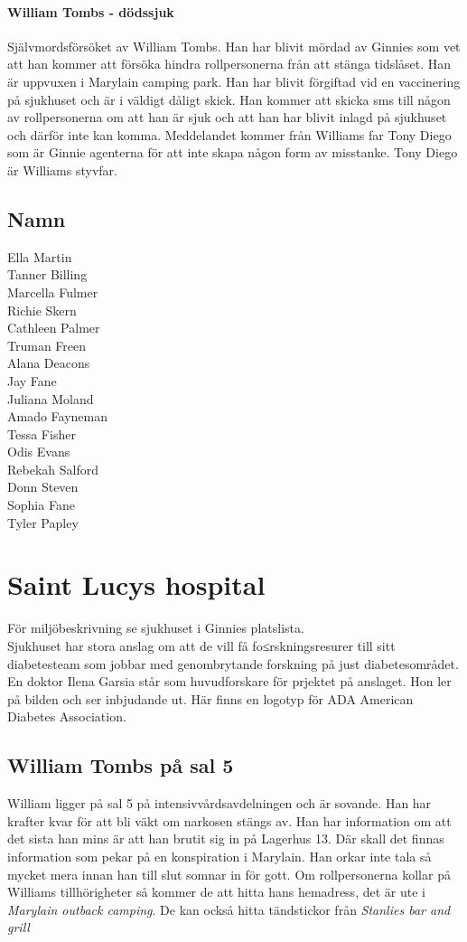 \paragraph{William Tombs - dödssjuk}
Självmordsförsöket av William Tombs. Han har blivit mördad av Ginnies som vet att han kommer att försöka hindra rollpersonerna från att stänga tidslåset. Han är uppvuxen i Marylain camping park. Han har blivit förgiftad vid en vaccinering på sjukhuset och är i väldigt dåligt skick. Han kommer att skicka sms till någon av rollpersonerna om att han är sjuk och att han har blivit inlagd på sjukhuset och därför inte kan komma. Meddelandet kommer från Williams far Tony Diego som är Ginnie agenterna för att inte skapa någon form av misstanke. Tony Diego är Williams styvfar.
\subsection{Namn}
Ella Martin\\
Tanner Billing\\
Marcella Fulmer\\
Richie Skern\\
Cathleen Palmer\\
Truman Freen\\
Alana Deacons\\
Jay Fane\\
Juliana Moland\\
Amado Fayneman\\
Tessa Fisher\\
Odis Evans\\
Rebekah Salford\\
Donn Steven\\
Sophia Fane\\
Tyler Papley
\section{Saint Lucys hospital}
För miljöbeskrivning se sjukhuset i Ginnies platslista.\\
Sjukhuset har stora anslag om att de vill få fo≤rskningsresurer till sitt diabetesteam som jobbar med genombrytande forskning på just diabetesområdet. En doktor Ilena Garsia står som huvudforskare för prjektet på anslaget. Hon ler på bilden och ser inbjudande ut. Här finns en logotyp för ADA American Diabetes Association.
\subsection{William Tombs på sal 5}
William ligger på sal 5 på intensivvårdsavdelningen och är sovande. Han har krafter kvar för att bli väkt om narkosen stängs av. Han har information om att det sista han mins är att han brutit sig in på Lagerhus 13. Där skall det finnas information som pekar på en konspiration i Marylain. Han orkar inte tala så mycket mera innan han till slut somnar in för gott. Om rollpersonerna kollar på Williams tillhörigheter så kommer de att hitta hans hemadress, det är ute i \textit{Marylain outback camping}. De kan också hitta tändstickor från \textit{Stanlies bar and grill}
